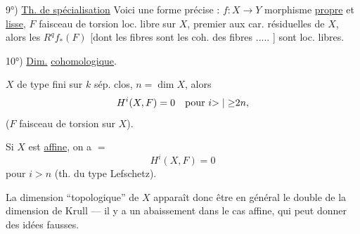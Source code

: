 9°) \uline{Th. de spécialisation} Voici  une forme précise : $f:X\to Y$ morphisme \uline{propre} et \uline{lisse}, $F$ faisceau de torsion loc. libre sur $X$, premier aux car. résiduelles de $X$, alors les $R^qf_*(F)$ [dont les fibres sont les coh. des fibres ..... ] sont loc. libres.

10°) \uline{Dim.} \uline{cohomologique}.

$X$ de type fini sur $k$ sép. clos, $n=\dim X$, alors
\[
H^i(X,F)=0\quad\text{pour }i\relax{>|\geq}2n,
\]
($F$ faisceau de torsion sur $X$).

Si $X$ est \uline{affine}, on a $=$
\[
H^i(X,F)=0
\]
pour $i>n$ (th. du type Lefschetz).

La dimension ``topologique'' de $X$ apparaît donc  être en général le double de la dimension de Krull --- il y a un abaissement dans le cas affine, qui peut donner des idées fausses.
